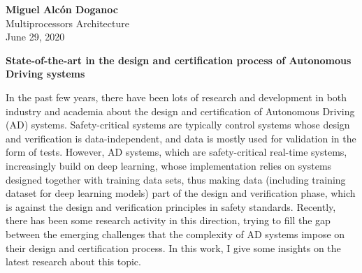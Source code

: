 \documentclass[a4paper, 10pt]{article}
\begin{document}
\noindent
\begin{flushright}
	\large\textbf{Miguel Alcón Doganoc} \\
	Multiprocessors Architecture \\
	June 29, 2020
\end{flushright}
\vspace{2mm}
\noindent
{\huge{\textbf{State-of-the-art in the design and certification process of Autonomous Driving systems}}}
\vspace{-3mm}

In the past few years, there have been lots of research and development in both industry and academia about the design and certification of Autonomous Driving (AD) systems. Safety-critical systems are typically control systems whose design and verification is data-independent, and data is mostly used for validation in the form of tests. However, AD systems, which are safety-critical real-time systems, increasingly build on deep learning, whose implementation relies on systems designed together with training data sets, thus making data (including training dataset for deep learning models) part of the design and verification phase, which is against the design and verification principles in safety standards. Recently, there has been some research activity in this direction, trying to fill the gap between the emerging challenges that the complexity of AD systems impose on their design and certification process. In this work, I give some insights on the latest research about this topic.

\end{document}
